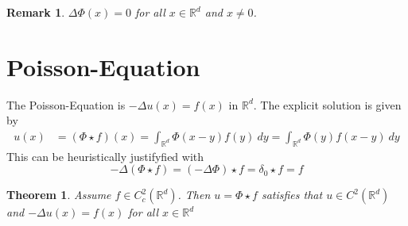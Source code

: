 \documentclass{report}
\theoremstyle{tommy}
\newtheorem{thm}[defn]{Theorem}
\newtheorem{rem}[defn]{Remark}
\begin{document}
\begin{rem}
  \(\Delta \Phi(x) = 0\) for all \(x \in \mathbb{R}^d\) and \(x \ne 0\). 
\end{rem}


\section{Poisson-Equation}
The Poisson-Equation is \(-\Delta u(x) = f(x)\) in \(\mathbb{R}^d\). The explicit solution is given by
\begin{align*}
  u(x) &= (\Phi \star f)(x)
  = \int_{\mathbb{R}^d} \Phi(x-y)f(y) \ dy 
  = \int_{\mathbb{R}^d} \Phi(y)f(x-y) \ dy
\end{align*}
This can be heuristically justifyfied with \[-\Delta (\Phi \star f) = (-\Delta \Phi) \star f = \delta_0 \star f = f\]


\begin{thm} \label{solution-for-poisson}
  Assume \(f \in C_c^2(\mathbb{R}^d)\). Then \(u = \Phi \star f\) satisfies that \(u \in C^2(\mathbb{R}^d)\) and \(- \Delta u(x) = f(x)\) for all \(x \in \mathbb{R}^d\)
\end{thm}
\end{document}
